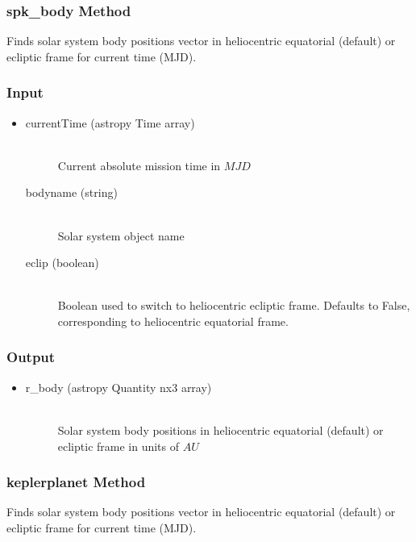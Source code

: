 \documentclass[cleanfoot]{asme2ej}
\begin{document}
\subsubsection{spk\_body Method} \label{}
Finds solar system body positions vector in heliocentric equatorial (default) or ecliptic frame for current time (MJD).
\subsubsection*{Input}
\begin{itemize}
\item
\begin{description}
    \item[currentTime (astropy Time array)] \hfill \\ Current absolute mission time in $MJD$
    \item[bodyname (string)] \hfill \\ Solar system object name
    \item[eclip (boolean)] \hfill \\Boolean used to switch to heliocentric ecliptic frame. Defaults to False, corresponding to heliocentric equatorial frame.
\end{description}
\end{itemize}
\subsubsection*{Output}
\begin{itemize}
\item
\begin{description}
    \item[r\_body (astropy Quantity nx3 array)] \hfill \\ Solar system body positions in heliocentric equatorial (default) or ecliptic frame in units of $AU$
\end{description}
\end{itemize}

\subsubsection{keplerplanet Method} \label{}
Finds solar system body positions vector in heliocentric equatorial (default) or ecliptic frame for current time (MJD).
\end{document}
